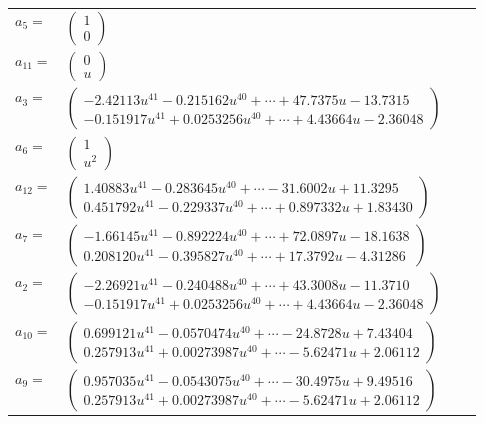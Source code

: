 \documentclass[1p]{elsarticle_modified}
\theoremstyle{definition}
\begin{document}
\begin{tabular}{m{7pt} m{180pt} m{7pt} m{180pt} }
\flushright $a_{5}=$&$\begin{pmatrix}1\\0\end{pmatrix}$ \\
\flushright $a_{11}=$&$\begin{pmatrix}0\\u\end{pmatrix}$ \\
\flushright $a_{3}=$&$\begin{pmatrix}-2.42113 u^{41}-0.215162 u^{40}+\cdots+47.7375 u-13.7315\\-0.151917 u^{41}+0.0253256 u^{40}+\cdots+4.43664 u-2.36048\end{pmatrix}$ \\
\flushright $a_{6}=$&$\begin{pmatrix}1\\u^2\end{pmatrix}$ \\
\flushright $a_{12}=$&$\begin{pmatrix}1.40883 u^{41}-0.283645 u^{40}+\cdots-31.6002 u+11.3295\\0.451792 u^{41}-0.229337 u^{40}+\cdots+0.897332 u+1.83430\end{pmatrix}$ \\
\flushright $a_{7}=$&$\begin{pmatrix}-1.66145 u^{41}-0.892224 u^{40}+\cdots+72.0897 u-18.1638\\0.208120 u^{41}-0.395827 u^{40}+\cdots+17.3792 u-4.31286\end{pmatrix}$ \\
\flushright $a_{2}=$&$\begin{pmatrix}-2.26921 u^{41}-0.240488 u^{40}+\cdots+43.3008 u-11.3710\\-0.151917 u^{41}+0.0253256 u^{40}+\cdots+4.43664 u-2.36048\end{pmatrix}$ \\
\flushright $a_{10}=$&$\begin{pmatrix}0.699121 u^{41}-0.0570474 u^{40}+\cdots-24.8728 u+7.43404\\0.257913 u^{41}+0.00273987 u^{40}+\cdots-5.62471 u+2.06112\end{pmatrix}$ \\
\flushright $a_{9}=$&$\begin{pmatrix}0.957035 u^{41}-0.0543075 u^{40}+\cdots-30.4975 u+9.49516\\0.257913 u^{41}+0.00273987 u^{40}+\cdots-5.62471 u+2.06112\end{pmatrix}$ \\

\end{tabular}
\end{document}

